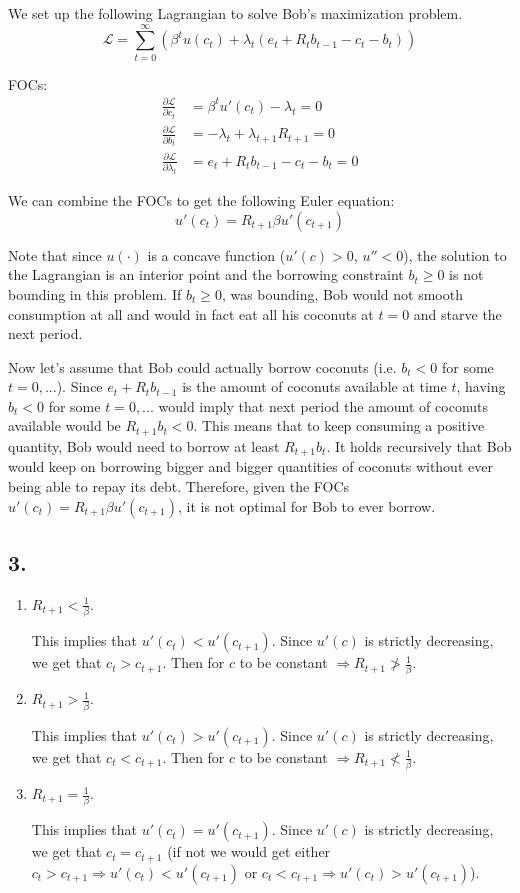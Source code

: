 \documentclass[12pt]{article}
\theoremstyle{definition}
\begin{document}
We set up the following Lagrangian to solve Bob's maximization problem.
\[
\mathcal{L} = \sum_{t=0}^{\infty}\left( \beta^t u(c_t)  + \lambda_t (e_t+R_tb_{t-1}-c_t-b_t)\right) 
\]

FOCs:
\[
\begin{split}
\frac{\partial \mathcal{L}}{\partial c_t} &= \beta^t u'(c_t)-\lambda_t = 0 \\
\frac{\partial \mathcal{L}}{\partial b_t} &= -\lambda_t + \lambda_{t+1}R_{t+1} = 0 \\
\frac{\partial \mathcal{L}}{\partial \lambda_t} &= e_t+R_tb_{t-1}-c_t-b_t = 0
\end{split}
\]

We can combine the FOCs to get the following Euler equation:
\[
\boxed{
u'(c_t)=R_{t+1}\beta u'(c_{t+1})
}
\]

Note that since $u(\cdot)$ is a concave function ($u'(c)>0$, $u''<0$), the solution to the Lagrangian is an interior point and the borrowing constraint $b_t \geq 0$ is not bounding in this problem. If $b_t \geq 0$, was bounding, Bob would not smooth consumption at all and would in fact eat all his coconuts at $t=0$ and starve the next period.

Now let's assume that Bob could actually borrow coconuts (i.e. $b_t < 0$ for some $t=0,...$). Since $e_t+R_tb_{t-1}$ is the amount of coconuts available at time $t$, having  $b_t < 0$ for some $t=0,...$ would imply that next period the amount of coconuts available would be $R_{t+1}b_{t}<0$. This means that to keep consuming a positive quantity, Bob would need to borrow at least $R_{t+1}b_{t}$. It holds recursively that Bob would keep on borrowing bigger and bigger quantities of coconuts without ever being able to repay its debt. Therefore, given the FOCs $u'(c_t)=R_{t+1}\beta u'(c_{t+1})$, it is not optimal for Bob to ever borrow.

\subsection*{3.}

\begin{enumerate}
	\item $R_{t+1}<\frac{1}{\beta}.$
	
	This implies that $u'(c_t)<u'(c_{t+1})$. Since $u'(c)$ is strictly decreasing, we get that $c_t>c_{t+1}$. Then for $c$ to be constant $\Rightarrow R_{t+1}\not>\frac{1}{\beta}.$
	\item $R_{t+1}>\frac{1}{\beta}.$
	
	This implies that $u'(c_t)>u'(c_{t+1})$. Since $u'(c)$ is strictly decreasing, we get that $c_t<c_{t+1}$. Then for $c$ to be constant $\Rightarrow R_{t+1}\not<\frac{1}{\beta}.$
	
	\item $R_{t+1}=\frac{1}{\beta}.$
	
	This implies that $u'(c_t)=u'(c_{t+1})$. Since $u'(c)$ is strictly decreasing, we get that $c_t=c_{t+1}$ (if not we would get either $c_t>c_{t+1} \Rightarrow u'(c_t)<u'(c_{t+1})$ or $c_t<c_{t+1} \Rightarrow u'(c_t)>u'(c_{t+1})$).
\end{enumerate}
\end{document}
